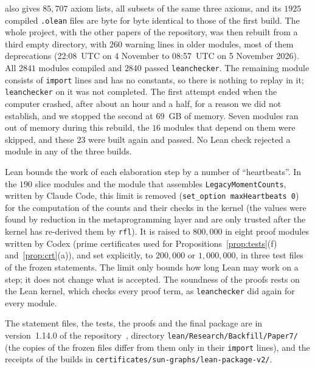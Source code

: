 \documentclass[11pt]{article}
\theoremstyle{definition}
\theoremstyle{remark}
\newcommand{\repoversion}{1.14.0}
\begin{document}
also gives $85{,}707$ axiom lists, all subsets of the same three axioms, and
its $1925$ compiled \texttt{.olean} files are byte for byte identical to those
of the first build.
The whole project, with the other papers of the repository, was then rebuilt
from a third empty directory, with $260$ warning lines in older modules, most of
them deprecations (22:08~UTC on 4 November to 08:57~UTC on 5 November 2026).
All $2841$ modules compiled and $2840$ passed \texttt{leanchecker}. The
remaining module consists of \texttt{import} lines and has no constants, so
there is nothing to replay in it; \texttt{leanchecker} on it was not completed.
The first attempt ended when the computer crashed, after about an hour and a
half, for a reason we did not establish, and we stopped the second at $69$~GB
of memory. Seven modules ran out of memory during this rebuild, the $16$ modules
that depend on them were skipped, and these $23$ were built again and passed.
No Lean check rejected a module in any of the three builds.

Lean bounds the work of each elaboration step by a number of ``heartbeats''.
In the $190$ slice modules and the module that assembles
\texttt{LegacyMomentCounts}, written by Claude Code, this limit is removed
(\texttt{set\_option maxHeartbeats 0}) for the computation of the counts and
their checks in the kernel (the values were found by reduction in the
metaprogramming layer and are only trusted after the kernel has re-derived them
by \texttt{rfl}). It is raised to $800{,}000$ in eight proof modules
written by Codex (prime certificates used for Propositions~\ref{prop:tests}(f)
and~\ref{prop:crt}(a)), and set explicitly, to $200{,}000$ or $1{,}000{,}000$,
in three test files of the frozen statements. The limit only bounds how long
Lean may work on a step; it does not change what is accepted. The soundness of
the proofs rests on the Lean kernel, which checks every proof term, as
\texttt{leanchecker} did again for every module.

The statement files, the tests, the proofs and the final package are in
version~\repoversion{} of the repository~\cite{repo}, directory
\texttt{lean/Research/Backfill/Paper7/} (the copies of the frozen files differ
from them only in their \texttt{import} lines), and the receipts of the builds in
\texttt{certificates/sun-graphs/lean-package-v2/}.
\end{document}
